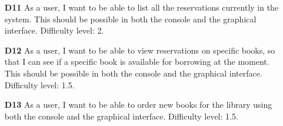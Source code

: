 \begin{itemize}
  \item [\textbf{D11}] As a user, I want to be able to list all the reservations currently in the system. This should be possible in both the console and the graphical interface. Difficulty level: 2.
  \item [\textbf{D12}] As a user, I want to be able to view reservations on specific books, so that I can see if a specific book is available for borrowing at the moment. This should be possible in both the console and the graphical interface. Difficulty level: 1.5.
  \item [\textbf{D13}] As a user, I want to be able to order new books for the library using both the console and the graphical interface. Difficulty level: 1.5.
\end{itemize}

\begin{comment}
\begin{table}
\begin{tabular}{ | l | l | l | }
  \hline
  \textbf{User Story} & \textbf{Difficulty Level} & \textbf{Description} \\ \hline
  A1 & 5            & Database persistence \\ \hline
  A2 & 6            & Real time server synchronization \\ \hline
  A3 & 4            & Exposing objects rather than raw data \\ \hline
  D1 & 1 (reference)    & Adding books \\ \hline
  D2 & 0.5          & rmeting books \\ \hline
  D3 & 2            & Editing books \\ \hline
  D4 & 0.75             & Searching for books \\ \hline
  D5 & 1.5          & Listing all books \\ \hline
  D6 & 1            & Register new customer \\ \hline
  D7 & 1.75             & Record when books are borrowed \\ \hline
  D8 & 2.5          & Edit records on a borrowing of a book \\ \hline
  D9 & 2            & List all currently borrowed books \\ \hline
  D10 & 3           & Record book reservations \\ \hline
  D11 & 2           & List all reservations \\ \hline
  D12 & 1.5             & View reservations on a book \\ \hline

\end{comment}
